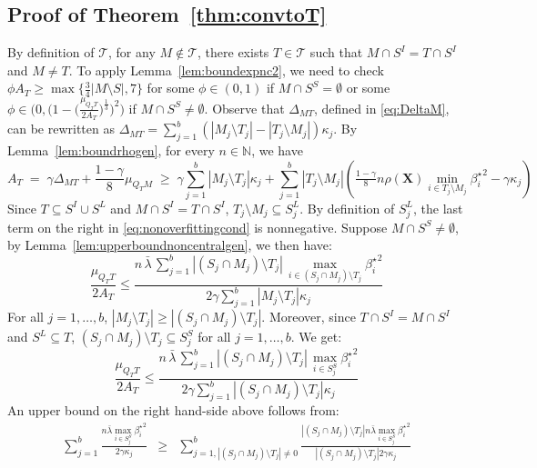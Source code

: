 \documentclass[aos]{imsart}
\theoremstyle{plain}
\newcommand{\N}{\mathbb{N}}
\newcommand{\bs}{\boldsymbol}
\begin{document}
\begin{supplement}
\subsection{Proof of Theorem~\ref{thm:convtoT}}
By definition of $\mathcal{T}$, for any $M \not\in\mathcal{T}$, there exists $T\in\mathcal{T}$ such that $M\cap S^I=T\cap S^I$ and $M\neq T$. To apply Lemma~\ref{lem:boundexpnc2}, we need to check $\phi A_T\geq \max\{\tfrac{3}{4}|M\setminus S|,7\}$ for some $\phi\in(0,1)$ if $M\cap S^S=\emptyset$ or some $\phi\in\bigg(0,\Big(1-\big(\frac{\mu_{Q_T T}}{2 A_T}\big)^{\frac{1}{3}}\Big)^2\bigg)$ if $M\cap S^S\neq\emptyset$. Observe that $\Delta_{MT}$, defined in \eqref{eq:DeltaM}, can be rewritten as $\Delta_{MT}=\sum_{j=1}^b(|M_j\setminus T_j|-|T_j\setminus M_j|)\kappa_j$. By Lemma~\ref{lem:boundrhogen}, for every $n\in \N$, we have 
\begin{equation}\label{eq:nonoverfittingcondgen}
   A_T\;=\; \gamma \Delta_{MT}+\frac{1-\gamma}{8}\mu_{Q_TM}\;\geq\; \gamma\sum_{j=1}^b|M_j \setminus T_j|\kappa_j + \sum_{j=1}^b |T_j\setminus M_j |\left(\tfrac{1-\gamma}{8} n \rho(\bs X) \min_{i\in T_j\setminus M_j}{\beta^{\star}_{i}}^{2} - \gamma\kappa_j\right) 
\end{equation}
 Since $T \subseteq S^I \cup S^L$ and $M\cap S^I=T\cap S^I$, $T_j\setminus M_j \subseteq S^L_j$. By definition of $S^L_j$, the last term on the right in \eqref{eq:nonoverfittingcond} is nonnegative. Suppose $M\cap S^S\neq\emptyset$, by Lemma~\ref{lem:upperboundnoncentralgen}, we then have:
$$\frac{\mu_{Q_T T}}{2 A_T} \leq \frac{n\,\bar{\lambda}\,\sum_{j=1}^b|(S_j\cap M_j )\setminus T_j|\,\max_{i\in (S_j\cap M_j )\setminus T_j}{\beta_{i}^{\star}}^2}{2 \gamma\sum_{j=1}^b|M_j \setminus T_j|\kappa_j}$$
For all $j=1,\ldots,b$, $|M_j \setminus T_j| \geq |(S_j\cap M_j )\setminus T_j|$. Moreover, since $T\cap S^I=M\cap S^I$ and $S^L\subseteq T$, $(S_j\cap M_j )\setminus T_j \subseteq S^S_j$ for all $j=1,\ldots,b$. We get:
$$\frac{\mu_{Q_T T}}{2 A_T} \leq \frac{n\,\bar{\lambda}\,\sum_{j=1}^b|(S_j\cap M_j )\setminus T_j|\,\max_{i\in S^S_j}{\beta_{i}^{\star}}^2}{2 \gamma\sum_{j=1}^b|(S_j\cap M_j ) \setminus T_j|\kappa_j}$$
An upper bound on the right hand-side above follows from:
\begin{eqnarray*}
    \sum_{j=1}^b\frac{n\bar{\lambda}\max_{i\in S^S_j}{\beta_i^{\star}}^2}{2\gamma\kappa_j}
    &\geq &\sum_{j=1,|(S_j\cap M_j )\setminus T_j|\neq 0}^b\frac{|(S_j\cap M_j )\setminus T_j|n\bar{\lambda}\max_{i\in S^S_j}{\beta_i^{\star}}^2}{|(S_j\cap M_j )\setminus T_j|2\gamma\kappa_j} \\

\end{eqnarray*}
\end{supplement}
\end{document}
